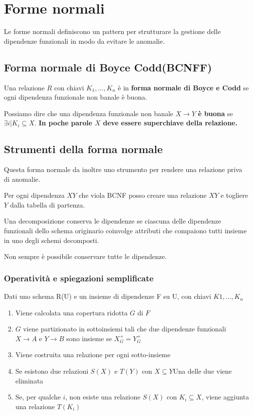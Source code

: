 \section{Forme normali}

Le forme normali definiscono un pattern per strutturare la gestione delle dipendenze funzionali in modo da evitare le anomalie.

\subsection{Forma normale di Boyce Codd(BCNFF)}

Una relazione $R$ con chiavi $K_1 ,..., K_n$ è in
\textbf{forma normale di Boyce e Codd} se ogni dipendenza funzionale non banale è buona.

Possiamo dire che una dipendenza funzionale non banale $X \rightarrow Y$ \textbf{è buona} se $\exists i | K_i \subseteq X$. \textbf{In poche parole $X$ deve essere superchiave della relazione.}

\subsection{Strumenti della forma normale}
Questa forma normale da inoltre uno strumento per rendere una relazione priva di anomalie.

Per ogni dipendenza $XY$ che viola BCNF posso creare una relazione $XY$ e togliere $Y$ dalla tabella di partenza.

Una decomposizione conserva le dipendenze se ciascuna delle dipendenze funzionali dello schema originario coinvolge attributi che compaiono tutti insieme in uno degli schemi decomposti.

Non sempre è possibile conservare tutte le dipendenze.

\subsubsection{Operatività e spiegazioni semplificate}

Dati uno schema R(U) e un insieme di dipendenze F su U, con
chiavi $K1, ... , K_n$

\begin{enumerate}
    \item Viene calcolata una copertura ridotta $G$ di $F$
    \item $G$ viene partizionato in sottoinsiemi tali che due dipendenze funzionali $X \rightarrow A$ e $Y \rightarrow B$ sono insieme se $X_G^+ = Y_G^+$
    \item Viene costruita una relazione per ogni sotto-insieme
    \item Se esistono due relazioni $S(X)$ e $T(Y)$ con $X \subseteq Y$Una delle due viene eliminata
    \item Se, per qualche $i$, non esiste una relazione $S(X)$ con $K_i \subseteq X$, viene aggiunta una relazione $T(K_i)$
\end{enumerate}

